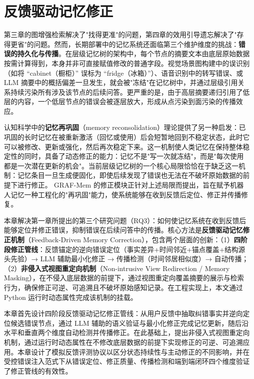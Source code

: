 
\chapter{反馈驱动记忆修正}

第三章的图增强检索解决了"找得更准"的问题，第四章的效用引导遗忘解决了"存得更省"的问题。然而，长期部署中的记忆系统还面临第三个维护维度的挑战：\textbf{错误的持久化与传播}。在层级记忆树的架构中，每个节点的摘要文本由底层原始数据按需计算得到，本身并非可直接赋值修改的普通字段。视觉场景图构建中的误识别（如将 “cabinet（橱柜）” 误标为 “fridge（冰箱）”）、语音识别中的转写错误、或 LLM 摘要中的概括偏差一旦发生，就会被"冻结"在记忆树中，并通过层级引用关系持续污染所有涉及该节点的后续问答。更严重的是，由于高层摘要递归引用了低层的内容，一个低层节点的错误会被逐层放大，形成从点污染到面污染的传播效应。

认知科学中的\textbf{记忆再巩固}（memory reconsolidation）理论提供了另一种启发：已巩固的长时记忆在被重新激活（回忆或使用）后会短暂地回到不稳定状态，此时它可以被修改、更新或强化，然后再次稳定下来。这一机制使人类记忆在保持整体稳定性的同时，具备了动态修正的能力：记忆不是"写一次就冻结"，而是"每次使用都是一次潜在更新的机会"。当前层级记忆树的一个核心局限恰恰在于缺乏这一机制：记忆条目一旦生成便固化，即使后续发现了错误也无法在不破坏原始数据的前提下进行修正。 GRAF-Mem 的修正模块正针对上述局限而提出，旨在赋予机器人记忆一种工程化的"再巩固"能力，使系统能够在收到反馈后定位、修正并传播修复。

本章解决第一章所提出的第三个研究问题（RQ3）：如何使记忆系统在收到反馈后能够定位并修正错误，抑制错误在后续问答中的传播。核心方法是\textbf{反馈驱动记忆修正机制}（Feedback-Driven Memory Correction），包含两个层面的创新：（1）\textbf{四阶段修正管线}：反馈锚定的逆向错误定位（事实差异+时间邻近+锚点覆盖+结构源头先验）→ LLM 辅助最小化修正 → 传播检测（时间邻居相似度）→ 自动传播；（2）\textbf{非侵入式视图重定向机制}（Non-intrusive View Redirection / Memory Masking），在不侵入底层数据的前提下，通过视图重定向覆盖摘要的展示与检索行为，确保修正可逆、可追溯且不破坏原始感知记录。在工程实现上，本文通过 Python 运行时动态属性完成该机制的挂载。

本章首先设计四阶段反馈驱动记忆修正管线：从用户反馈中抽取纠错事实并逆向定位候选错误节点，通过 LLM 辅助的语义验证与最小化修正完成记忆更新，随后沿水平和垂直两个维度自动检测并传播修正。在此基础上，提出非侵入式视图重定向机制，通过运行时动态属性在不修改底层数据的前提下实现修正的可逆、可追溯应用。本章设计了模拟反馈评测协议以区分状态持续性与主动修正的不同影响，并在受控错误注入范式下从错误定位、修正质量、传播检测和端到端闭环四个维度验证了修正管线的有效性。

